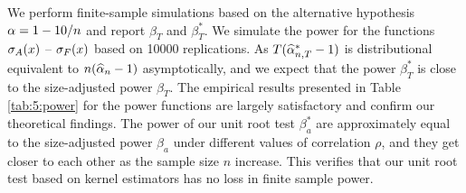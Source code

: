 We perform finite-sample simulations based on the alternative hypothesis $\alpha = 1 - 10 / n$ and report $\beta_T$ and $\beta_T^*$. We simulate the power for the functions $\sigma_A(x)$ -- $\sigma_F(x)$ based on 10000 replications. As $T(\widehat{\alpha}_{n,T}^* - 1)$ is distributional equivalent to $n(\widehat{\al}_n - 1)$ asymptotically, and we expect that the power $\beta_T^*$ is close to the size-adjusted power $\beta_T$. The empirical results presented in Table \ref{tab:5:power} for the power functions are largely satisfactory and confirm our theoretical findings. The power of our unit root test $\beta^*_a$ are approximately equal to the size-adjusted power $\beta_a$ under different values of correlation $\rho$, and they get closer to each other as the sample size $n$ increase. This verifies that our unit root test based on kernel estimators has no loss in finite sample power.
\begin{table}[!ht] 
\selectfont \caption{The local power of unit root test based on standard critical values $n(\widehat{\al}_n - 1)$ and simulated critical values $T( \widehat{\al}^*_{n,T} - 1)$.}
\label{GseqTable} 
\end{table}



